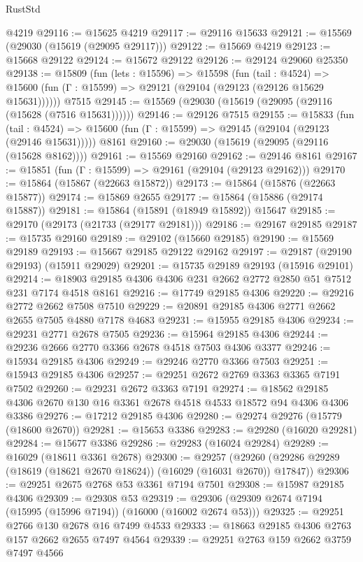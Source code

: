 \begin{lexlean}{RustStd}
\begin{coremodule}
    @4219
@29116 := @15625 @4219
@29117 := @29116 @15633
@29121 := @15569 (@29030 (@15619 (@29095 @29117)))
@29122 := @15669 @4219
@29123 := @15668 @29122
@29124 := @15672 @29122
@29126 := @29124 @29060 @25350
@29138 := @15809
    (fun (lets : @15596) =>
    @15598
      (fun (tail : @4524) =>
      @15600 (fun (Γ : @15599) => @29121 (@29104 (@29123 (@29126 @15629 @15631))))))
    @7515
@29145 := @15569 (@29030 (@15619 (@29095 (@29116 (@15628 (@7516 @15631))))))
@29146 := @29126 @7515
@29155 := @15833
    (fun (tail : @4524) => @15600 (fun (Γ : @15599) => @29145 (@29104 (@29123 (@29146 @15631)))))
    @8161
@29160 := @29030 (@15619 (@29095 (@29116 (@15628 @8162))))
@29161 := @15569 @29160
@29162 := @29146 @8161
@29167 := @15851 (fun (Γ : @15599) => @29161 (@29104 (@29123 @29162)))
@29170 := @15864 (@15867 (@22663 @15872))
@29173 := @15864 (@15876 (@22663 @15877))
@29174 := @15869 @2655
@29177 := @15864 (@15886 (@29174 @15887))
@29181 := @15864 (@15891 (@18949 @15892)) @15647
@29185 := @29170 (@29173 (@21733 (@29177 @29181)))
@29186 := @29167 @29185
@29187 := @15735 @29160
@29189 := @29102 (@15660 @29185)
@29190 := @15569 @29189
@29193 := @15667 @29185 @29122 @29162
@29197 := @29187 (@29190 @29193) (@15911 @29029)
@29201 := @15735 @29189 @29193 (@15916 @29101)
@29214 := @18903 @29185 @4306 @4306 @231 @2662 @2772 @2850 @51 @7512 @231 @7174 @4518 @8161
@29216 := @17749 @29185 @4306
@29220 := @29216 @2772 @2662 @7508 @7510
@29229 := @20891 @29185 @4306 @2771 @2662 @2655 @7505 @4880 @7178 @4683
@29231 := @15955 @29185 @4306
@29234 := @29231 @2771 @2678 @7505
@29236 := @15964 @29185 @4306
@29244 := @29236 @2666 @2770 @3366 @2678 @4518 @7503 @4306 @3377
@29246 := @15934 @29185 @4306
@29249 := @29246 @2770 @3366 @7503
@29251 := @15943 @29185 @4306
@29257 := @29251 @2672 @2769 @3363 @3365 @7191 @7502
@29260 := @29231 @2672 @3363 @7191
@29274 := @18562 @29185 @4306 @2670 @130 @16 @3361 @2678 @4518 @4533 @18572 @94 @4306 @4306 @3386
@29276 := @17212 @29185 @4306
@29280 := @29274 @29276 (@15779 (@18600 @2670))
@29281 := @15653 @3386
@29283 := @29280 (@16020 @29281)
@29284 := @15677 @3386
@29286 := @29283 (@16024 @29284)
@29289 := @16029 (@18611 @3361 @2678)
@29300 := @29257
    (@29260 (@29286 @29289 (@18619 (@18621 @2670 @18624)) (@16029 (@16031 @2670)) @17847))
@29306 := @29251 @2675 @2768 @53 @3361 @7194 @7501
@29308 := @15987 @29185 @4306
@29309 := @29308 @53
@29319 := @29306 (@29309 @2674 @7194 (@15995 (@15996 @7194)) (@16000 (@16002 @2674 @53)))
@29325 := @29251 @2766 @130 @2678 @16 @7499 @4533
@29333 := @18663 @29185 @4306 @2763 @157 @2662 @2655 @7497 @4564
@29339 := @29251 @2763 @159 @2662 @3759 @7497 @4566

\end{coremodule}
\end{lexlean}
